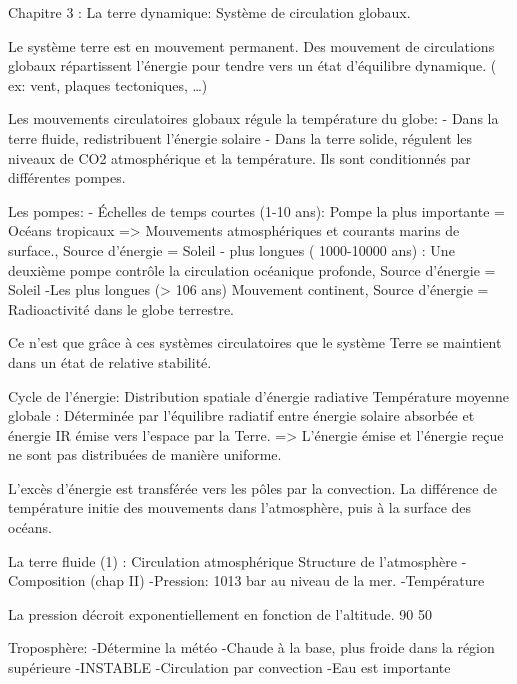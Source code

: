 Chapitre 3 : La terre dynamique:
Système de circulation globaux.


Le système terre est en mouvement permanent.
Des mouvement de circulations globaux répartissent l’énergie pour tendre vers un état d’équilibre dynamique. ( ex: vent, plaques tectoniques, …)


Les mouvements circulatoires globaux régule la température du globe:
- Dans la terre fluide, redistribuent l’énergie solaire
- Dans la terre solide, régulent les niveaux de CO2 atmosphérique et la température.
Ils sont conditionnés par différentes pompes.


Les pompes:
- Échelles de temps courtes (1-10 ans): Pompe la plus importante = Océans tropicaux
        => Mouvements atmosphériques et courants marins de surface.,
        Source d’énergie = Soleil
- plus longues ( 1000-10000 ans) : Une deuxième pompe contrôle la circulation océanique profonde, Source d’énergie = Soleil
-Les plus longues (> 106 ans) Mouvement continent,
        Source d’énergie = Radioactivité dans le globe terrestre.


Ce n’est que grâce à ces systèmes circulatoires que le système Terre se maintient dans un état de relative stabilité.
 


Cycle de l’énergie: Distribution spatiale d’énergie radiative
Température moyenne globale : Déterminée par l’équilibre radiatif entre énergie solaire absorbée et énergie IR émise vers l’espace par la Terre.
=> L’énergie émise et l’énergie reçue ne sont pas distribuées de manière uniforme.


  



  



L’excès d’énergie est transférée vers les pôles par la convection.
La différence de température initie des mouvements dans l’atmosphère, puis à la surface des océans.


La terre fluide (1) : Circulation atmosphérique
Structure de l’atmosphère
-Composition (chap II)
-Pression: 1013 bar au niveau de la mer.
-Température


La pression décroit exponentiellement en fonction de l’altitude.
90%
50%


  





Troposphère:
-Détermine la météo
-Chaude à la base, plus froide dans la région supérieure
-INSTABLE
-Circulation par convection
-Eau est importante


